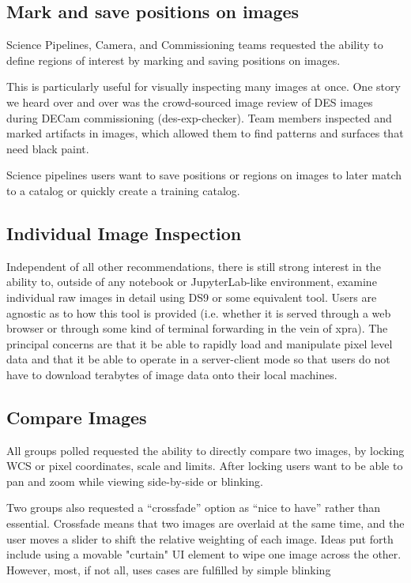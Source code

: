 \subsection{Mark and save positions on images}

Science Pipelines, Camera, and Commissioning teams requested the ability to define regions of interest by marking and saving positions on images.

This is particularly useful for visually inspecting many images at once.
One story we heard over and over was the crowd-sourced image review of DES images during DECam commissioning (des-exp-checker).
Team members inspected and marked artifacts in images, which allowed them to find patterns and surfaces that need black paint.

Science pipelines users want to save positions or regions on images to later match to a catalog or quickly create a training catalog.

\subsection{Individual Image Inspection}
\label{sec:ds9}
Independent of all other recommendations, there is still strong interest in the
ability to, outside of any notebook or JupyterLab-like environment, examine
individual raw images in detail using DS9 or some equivalent tool.  Users are
agnostic as to how this tool is provided (i.e. whether it is served through a
web browser or through some kind of terminal forwarding in the vein of xpra).
The principal concerns are that it be able to rapidly load and manipulate pixel
level data and that it be able to operate in a server-client mode so that users
do not have to download terabytes of image data onto their local machines.

\subsection{Compare Images}

All groups polled requested the ability to directly compare two images, by locking WCS or pixel coordinates, scale and limits.
After locking users want to be able to pan and zoom while viewing side-by-side or blinking.

Two groups also requested a ``crossfade'' option as ``nice to have'' rather than essential.
Crossfade means that two images are overlaid at the same time, and the user moves a slider to shift the relative weighting of each image.
Ideas put forth include using a movable "curtain" UI element to wipe one image across the other.
However, most, if not all, uses cases are fulfilled by simple blinking

